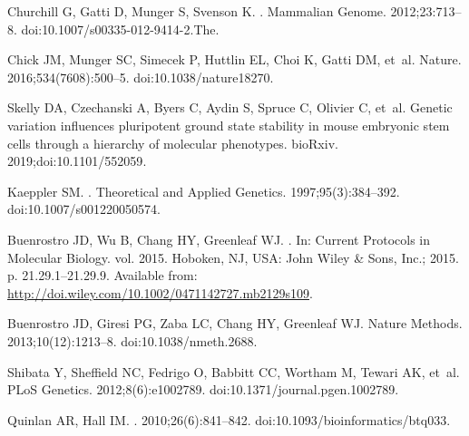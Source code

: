 \documentclass[10pt,letterpaper]{article}
\begin{document}
\begin{thebibliography}{10}
Churchill G, Gatti D, Munger S, Svenson K.
.
\newblock Mammalian Genome. 2012;23:713--8.
\newblock doi:{10.1007/s00335-012-9414-2.The}.

Chick JM, Munger SC, Simecek P, Huttlin EL, Choi K, Gatti DM, et~al.
\newblock Nature. 2016;534(7608):500--5.
\newblock doi:{10.1038/nature18270}.

Skelly DA, Czechanski A, Byers C, Aydin S, Spruce C, Olivier C, et~al.
\newblock Genetic variation influences pluripotent ground state stability in
  mouse embryonic stem cells through a hierarchy of molecular phenotypes.
\newblock bioRxiv. 2019;doi:{10.1101/552059}.

Kaeppler SM.
.
\newblock Theoretical and Applied Genetics. 1997;95(3):384--392.
\newblock doi:{10.1007/s001220050574}.

Buenrostro JD, Wu B, Chang HY, Greenleaf WJ.
.
\newblock In: Current Protocols in Molecular Biology. vol. 2015. Hoboken, NJ,
  USA: John Wiley {\&} Sons, Inc.; 2015. p. 21.29.1--21.29.9.
\newblock Available from:
  \url{http://doi.wiley.com/10.1002/0471142727.mb2129s109}.

Buenrostro JD, Giresi PG, Zaba LC, Chang HY, Greenleaf WJ.
\newblock Nature Methods. 2013;10(12):1213--8.
\newblock doi:{10.1038/nmeth.2688}.

Shibata Y, Sheffield NC, Fedrigo O, Babbitt CC, Wortham M, Tewari AK, et~al.
\newblock PLoS Genetics. 2012;8(6):e1002789.
\newblock doi:{10.1371/journal.pgen.1002789}.

Quinlan AR, Hall IM.
. 2010;26(6):841--842.
\newblock doi:{10.1093/bioinformatics/btq033}.


\end{thebibliography}
\end{document}
